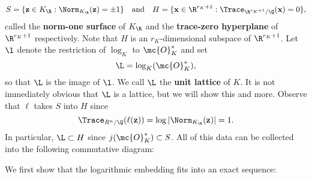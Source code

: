       \[
        S = \{\mathbf{z} \in K_{\R}:\Norm_{K_{\R}}(\mathbf{z}) = \pm 1\} \quad \text{and} \quad H = \{\mathbf{x} \in \R^{r_{K}+1}:\Trace_{\R^{r_{K}+1}/\Q}(\mathbf{x}) = 0\},
      \]
      called the \textbf{norm-one surface} of $K_{\R}$ and the \textbf{trace-zero hyperplane} of $\R^{r_{K}+1}$ respectively. Note that $H$ is an $r_{K}$-dimensional subspace of $\R^{r_{K}+1}$. Let $\l$ denote the restriction of $\log_{K}$ to $\mc{O}_{K}^{\ast}$ and set
      \[
        \L = \log_{K}(\mc{O}_{K}^{\ast}),
      \]
      so that $\L$ is the image of $\l$. We call $\L$ the \textbf{unit lattice} of $K$. It is not immediately obvious that $\L$ is a lattice, but we will show this and more. Observe that $\ell$ takes $S$ into $H$ since
      \[
        \Trace_{R^{n}/\Q}(\ell(\mathbf{z})) = \log|\Norm_{K_{\R}}(\mathbf{z})| = 1.
      \]
      In particular, $\L \subset H$ since $j(\mc{O}_{K}^{\ast}) \subset S$. All of this data can be collected into the following commutative diagram:

      \begin{center}
      \end{center}
      
      We first show that the logarithmic embedding fits into an exact sequence:

